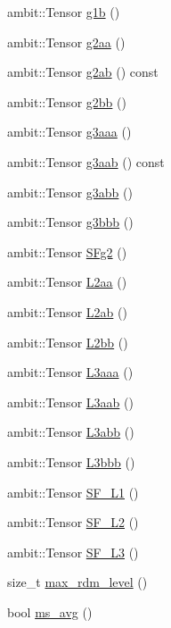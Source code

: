 \begin{DoxyCompactItemize}
\item 
ambit\+::\+Tensor \mbox{\hyperlink{classforte_1_1_r_d_ms_aa71a38929b7b94762d51afd5fd796fa9}{g1b}} ()
\item 
ambit\+::\+Tensor \mbox{\hyperlink{classforte_1_1_r_d_ms_a632afec6c1bfe555e0df992d23b1ac6c}{g2aa}} ()
\item 
ambit\+::\+Tensor \mbox{\hyperlink{classforte_1_1_r_d_ms_a5c2574da5bf2aba775481f0c46fb4202}{g2ab}} () const
\item 
ambit\+::\+Tensor \mbox{\hyperlink{classforte_1_1_r_d_ms_a60b2559c5aeb5d447335ebcd2897d4ad}{g2bb}} ()
\item 
ambit\+::\+Tensor \mbox{\hyperlink{classforte_1_1_r_d_ms_a7e97b6c90f40a9efe1adc58ca9cfb844}{g3aaa}} ()
\item 
ambit\+::\+Tensor \mbox{\hyperlink{classforte_1_1_r_d_ms_a968c6ae793d2cb19a69d5f6412032557}{g3aab}} () const
\item 
ambit\+::\+Tensor \mbox{\hyperlink{classforte_1_1_r_d_ms_a022f38931e0a3a359035e01c29e9e948}{g3abb}} ()
\item 
ambit\+::\+Tensor \mbox{\hyperlink{classforte_1_1_r_d_ms_ad38af9f4dfcf8694d56922ccaf422ade}{g3bbb}} ()
\item 
ambit\+::\+Tensor \mbox{\hyperlink{classforte_1_1_r_d_ms_a243bc245d6f69251fa4d4c39b895e19a}{S\+Fg2}} ()
\item 
ambit\+::\+Tensor \mbox{\hyperlink{classforte_1_1_r_d_ms_a415f5e71d89b9a8fcb9b7cb490a49b36}{L2aa}} ()
\item 
ambit\+::\+Tensor \mbox{\hyperlink{classforte_1_1_r_d_ms_a413a6f8fec662a0c8c6801f6354cad91}{L2ab}} ()
\item 
ambit\+::\+Tensor \mbox{\hyperlink{classforte_1_1_r_d_ms_ab17613d72744866495c70c87df7fc8fd}{L2bb}} ()
\item 
ambit\+::\+Tensor \mbox{\hyperlink{classforte_1_1_r_d_ms_acdea5a25d0dfd063e38694b80688e8c4}{L3aaa}} ()
\item 
ambit\+::\+Tensor \mbox{\hyperlink{classforte_1_1_r_d_ms_af463c018e20d7e16a72540b0eaa25cff}{L3aab}} ()
\item 
ambit\+::\+Tensor \mbox{\hyperlink{classforte_1_1_r_d_ms_a6e86cf45f7e726c9c9a71848d1d6bfa7}{L3abb}} ()
\item 
ambit\+::\+Tensor \mbox{\hyperlink{classforte_1_1_r_d_ms_af93f2491070637b6411891a07b078baf}{L3bbb}} ()
\item 
ambit\+::\+Tensor \mbox{\hyperlink{classforte_1_1_r_d_ms_a983790e296b2621004320ee33e31871f}{S\+F\+\_\+\+L1}} ()
\item 
ambit\+::\+Tensor \mbox{\hyperlink{classforte_1_1_r_d_ms_a9048dfc67c659693768bc67af466b115}{S\+F\+\_\+\+L2}} ()
\item 
ambit\+::\+Tensor \mbox{\hyperlink{classforte_1_1_r_d_ms_a56608c142344970d45c2c64e91e065e4}{S\+F\+\_\+\+L3}} ()
\item 
size\+\_\+t \mbox{\hyperlink{classforte_1_1_r_d_ms_a4040065ede146dd33fadd2f8350bfcc1}{max\+\_\+rdm\+\_\+level}} ()
\item 
bool \mbox{\hyperlink{classforte_1_1_r_d_ms_a9f729f9c1e45de736cf8095bdd5cf013}{ms\+\_\+avg}} ()
\end{DoxyCompactItemize}
